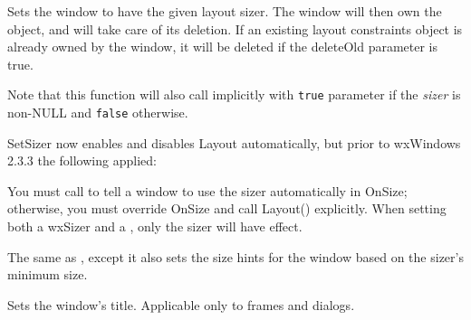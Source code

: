 Sets the window to have the given layout sizer. The window
will then own the object, and will take care of its deletion.
If an existing layout constraints object is already owned by the
window, it will be deleted if the deleteOld parameter is true.

Note that this function will also call 
 implicitly with {\tt true}
parameter if the {\it sizer}\/ is non-NULL and {\tt false} otherwise.





SetSizer now enables and disables Layout automatically, but prior to wxWindows 2.3.3
the following applied:

You must call  to tell a window to use
the sizer automatically in OnSize; otherwise, you must override OnSize and call Layout()
explicitly. When setting both a wxSizer and a ,
only the sizer will have effect.

\label{wxwindowsetsizerandfit}


The same as , except it also sets the size hints
for the window based on the sizer's minimum size.

\label{wxwindowsettitle}


Sets the window's title. Applicable only to frames and dialogs.





\label{wxwindowsetthemeenabled}

